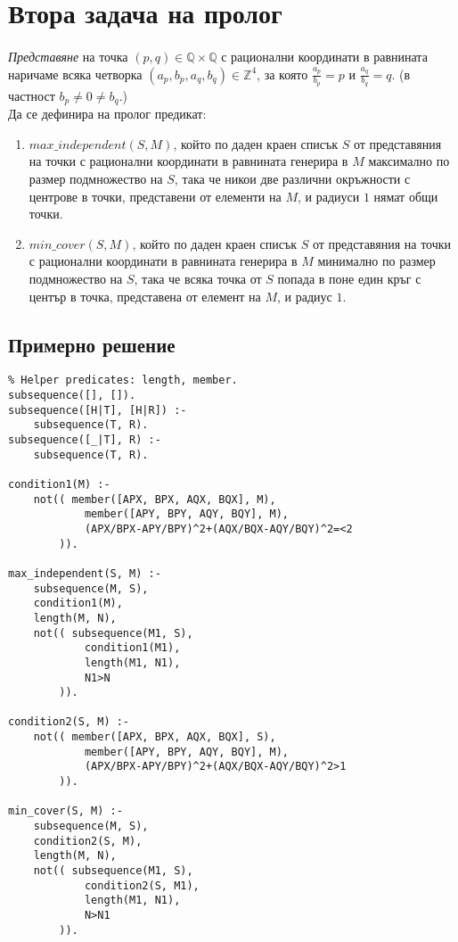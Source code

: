 \documentclass[12pt]{article}
\newenvironment{longlisting}{\captionsetup{type=listing}}{}
\begin{document}
\newpage
\section{Втора задача на пролог}
\paragraph{}
\emph{Представяне} на точка $(p,q)\in \mathbb{Q}\times \mathbb{Q}$ с рационални координати в равнината наричаме всяка
четворка $(a_p,b_p,a_q,b_q)\in \mathbb{Z}^4$, за която $\frac{a_p}{b_p}=p$ и $\frac{a_q}{b_q}=q$. (в частност $b_p\neq 0\neq b_q$.) \\
\indent Да се дефинира на пролог предикат: 
\begin{enumerate}
    \item$max\_independent(S,M)$, който по даден краен списък $S$ от представяния на точки с рационални
    координати в равнината генерира в $M$ максимално по размер подмножество на $S$, така че никои две различни окръжности с центрове 
    в точки, представени от елементи на $M$, и радиуси $1$ нямат общи точки. 
    \item$min\_cover(S,M)$, който по даден краен списък $S$ от представяния на точки с рационални
    координати в равнината генерира в $M$ минимално по размер подмножество на $S$, така че всяка точка от $S$ попада в поне един
    кръг с център в точка, представена от елемент на $M$, и радиус $1$. 
\end{enumerate}


\subsection{Примерно решение} 
\begin{longlisting}
\begin{verbatim}
% Helper predicates: length, member.
subsequence([], []).
subsequence([H|T], [H|R]) :-
    subsequence(T, R).
subsequence([_|T], R) :-
    subsequence(T, R).

condition1(M) :-
    not(( member([APX, BPX, AQX, BQX], M),
            member([APY, BPY, AQY, BQY], M),
            (APX/BPX-APY/BPY)^2+(AQX/BQX-AQY/BQY)^2=<2
        )).

max_independent(S, M) :-
    subsequence(M, S),
    condition1(M),
    length(M, N),
    not(( subsequence(M1, S),
            condition1(M1),
            length(M1, N1),
            N1>N
        )).

condition2(S, M) :-
    not(( member([APX, BPX, AQX, BQX], S),
            member([APY, BPY, AQY, BQY], M),
            (APX/BPX-APY/BPY)^2+(AQX/BQX-AQY/BQY)^2>1
        )).

min_cover(S, M) :-
    subsequence(M, S),
    condition2(S, M),
    length(M, N),
    not(( subsequence(M1, S),
            condition2(S, M1),
            length(M1, N1),
            N>N1
        )).
\end{verbatim}
\end{longlisting}
\end{document}

